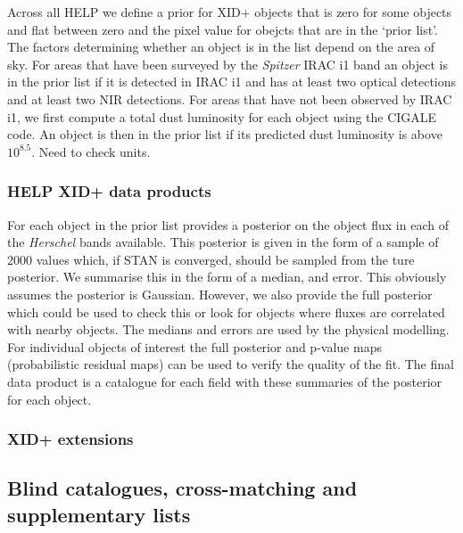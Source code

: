 \documentclass[usenatbib]{mnras}
\begin{document}
Across all HELP we define a prior for {\sc XID+} objects that is zero for some objects and flat between zero and the pixel value for obejcts that are in the `prior list'. The factors determining whether an object is in the list depend on the area of sky. For areas that have been surveyed by the \emph{Spitzer} IRAC i1 band an object is in the prior list if it is detected in IRAC i1 and has at least two optical detections and at least two NIR detections. For areas that have not been observed by IRAC i1, we first compute a total dust luminosity for each object using the CIGALE code. An object is then in the prior list if its predicted dust luminosity is above {\color{red} $10^{8.5}$. Need to check units}.


\subsubsection{HELP XID+ data products}

For each object in the prior list  provides a posterior on the object flux in each of the \emph{Herschel} bands available. This posterior is given in the form of a sample of 2000 values which, if STAN is converged, should be sampled from the ture posterior. We summarise this in the form of a median, and error. This obviously assumes the posterior is Gaussian. However, we also provide the full posterior which could be used to check this or look for objects where fluxes are correlated with nearby objects. The medians and errors are used by the physical modelling. For individual objects of interest the full posterior and p-value maps (probabilistic residual maps) can be used to verify the quality of the fit. The final data product is a catalogue for each field with these summaries of the posterior for each object.



\subsubsection{XID+ extensions}


\subsection[Blind catalogues, cross-matching and supplementary lists\\{\color{red}Some of this should go into the strategy as it is not implemented in DR1, but this is where to discuss the blind SPIRE catalogues that Steven has produced, plus spec-z catalogues, radio catalogues?}]{Blind catalogues, cross-matching and supplementary lists}
\end{document}
